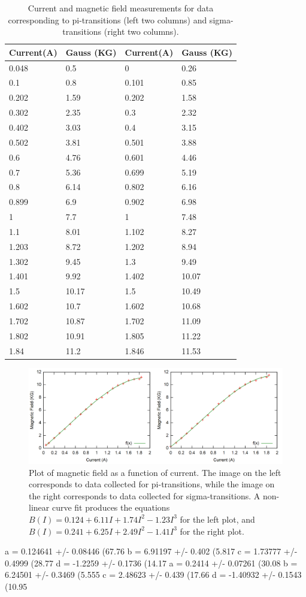 \documentclass[12pt]{article}
\begin{document}
\begin{table}[h!]\centering
\begin{tabular}{ |p{2.5cm}|p{2.5cm}||p{2.5cm}|p{2.5cm}|}
 \hline
Current(A)&	Gauss (KG)& Current(A)&	Gauss (KG)\\
\hline
0.048&	0.5&	0&	0.26\\
0.1&	0.8&	0.101&	0.85\\
0.202&	1.59&	0.202&	1.58\\
0.302&	2.35&	0.3&	2.32\\
0.402&	3.03&	0.4&	3.15\\
0.502&	3.81&	0.501&	3.88\\
0.6&	4.76&	0.601&	4.46\\
0.7&	5.36&	0.699&	5.19\\
0.8&	6.14&	0.802&	6.16\\
0.899&	6.9&	0.902&	6.98\\
1&	    7.7&	1&	    7.48\\
1.1&	8.01&	1.102&	8.27\\
1.203&	8.72&	1.202&	8.94\\
1.302&	9.45&	1.3&	9.49\\
1.401&	9.92&	1.402&	10.07\\
1.5&	10.17&	1.5&	10.49\\
1.602&	10.7&	1.602&	10.68\\
1.702&	10.87&	1.702&	11.09\\
1.802&	10.91&	1.805&	11.22\\
1.84&	11.2&	1.846&	11.53\\
\hline
\end{tabular}
\def\sym#1{\ifmmode^{#1}\else\(^{#1}\)\fi}
\caption{Current and magnetic field measurements for data corresponding to pi-transitions (left two columns) and sigma-transitions (right two columns).}
\label{tab:current}
\end{table}


\begin{figure}[h!]\centering
 \quad \includegraphics[width=01\textwidth]{picurrent}
\caption{Plot of magnetic field as a function of current. The image on the left corresponds to data collected for pi-transitions, while the image on the right corresponds to data collected for sigma-transitions. A non-linear curve fit produces the equations $B(I) = 0.124 + 6.11I + 1.74I^2 - 1.23I^3$ for the left plot, and  $B(I) = 0.241 + 6.25I + 2.49I^2 - 1.41I^3$ for the right plot.}
\label{fig:pigraph}
\end{figure}

a = 0.124641 +/- 0.08446 (67.76%
b = 6.91197 +/- 0.402 (5.817%
c = 1.73777 +/- 0.4999 (28.77%
d = -1.2259 +/- 0.1736 (14.17%
a = 0.2414 +/- 0.07261 (30.08%
b = 6.24501 +/- 0.3469 (5.555%
c = 2.48623 +/- 0.439 (17.66%
d = -1.40932 +/- 0.1543 (10.95%
\end{document}
